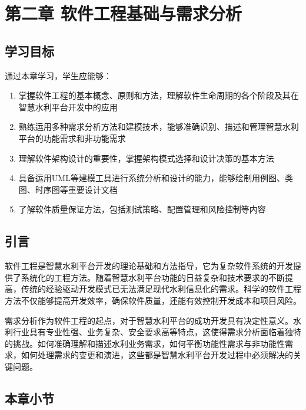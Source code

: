 \section{第二章 软件工程基础与需求分析}\label{ux7b2cux4e8cux7ae0-ux8f6fux4ef6ux5de5ux7a0bux57faux7840ux4e0eux9700ux6c42ux5206ux6790}

\subsection{学习目标}\label{ux5b66ux4e60ux76eeux6807}

通过本章学习，学生应能够：

\begin{enumerate}
\def\labelenumi{\arabic{enumi}.}
\tightlist
\item
  掌握软件工程的基本概念、原则和方法，理解软件生命周期的各个阶段及其在智慧水利平台开发中的应用
\item
  熟练运用多种需求分析方法和建模技术，能够准确识别、描述和管理智慧水利平台的功能需求和非功能需求
\item
  理解软件架构设计的重要性，掌握架构模式选择和设计决策的基本方法
\item
  具备运用UML等建模工具进行系统分析和设计的能力，能够绘制用例图、类图、时序图等重要设计文档
\item
  了解软件质量保证方法，包括测试策略、配置管理和风险控制等内容
\end{enumerate}

\subsection{引言}\label{ux5f15ux8a00}

软件工程是智慧水利平台开发的理论基础和方法指导，它为复杂软件系统的开发提供了系统化的工程方法。随着智慧水利平台功能的日益复杂和技术要求的不断提高，传统的经验驱动开发模式已无法满足现代水利信息化的需求。科学的软件工程方法不仅能够提高开发效率，确保软件质量，还能有效控制开发成本和项目风险。

需求分析作为软件工程的起点，对于智慧水利平台的成功开发具有决定性意义。水利行业具有专业性强、业务复杂、安全要求高等特点，这使得需求分析面临着独特的挑战。如何准确理解和描述水利业务需求，如何平衡功能性需求与非功能性需求，如何处理需求的变更和演进，这些都是智慧水利平台开发过程中必须解决的关键问题。

\subsection{本章小节}\label{ux672cux7ae0ux5c0fux8282}

